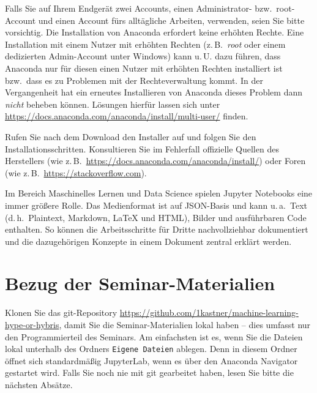 \documentclass{tufte-handout}
\begin{document}
Falls Sie auf Ihrem Endgerät zwei Accounts, einen Administrator- bzw.\ root-Account und einen Account fürs alltägliche Arbeiten, verwenden, seien Sie bitte vorsichtig.
Die Installation von Anaconda erfordert keine erhöhten Rechte.
Eine Installation mit einem Nutzer mit erhöhten Rechten (z.\,B.\ \emph{root} oder einem dedizierten Admin-Account unter Windows) kann u.\,U. dazu führen, dass Anaconda nur für diesen einen Nutzer mit erhöhten Rechten installiert ist bzw.\ dass es zu Problemen mit der Rechteverwaltung kommt.
In der Vergangenheit hat ein erneutes Installieren von Anaconda dieses Problem dann \emph{nicht} beheben können.
Lösungen hierfür lassen sich unter \url{https://docs.anaconda.com/anaconda/install/multi-user/} finden. 

Rufen Sie nach dem Download den Installer auf und folgen Sie den Installationsschritten.
Konsultieren Sie im Fehlerfall offizielle Quellen des Herstellers (wie z.\,B.\ \url{https://docs.anaconda.com/anaconda/install/})
oder Foren (wie z.\,B.\ \url{https://stackoverflow.com}).


Im Bereich Maschinelles Lernen und Data Science spielen Jupyter Notebooks eine immer größere Rolle.
Das Medienformat ist auf JSON-Basis und kann u.\,a.\
Text (d.\,h.\ Plaintext, Markdown, LaTeX und HTML),
Bilder und
ausführbaren Code enthalten.
So können die Arbeitsschritte für Dritte nachvollziehbar dokumentiert und die dazugehörigen Konzepte in einem Dokument zentral erklärt werden.


\section{Bezug der Seminar-Materialien}
\label{sec:git-clone}

Klonen Sie das git-Repository
\url{https://github.com/1kastner/machine-learning-hype-or-hybris},
damit Sie die Seminar-Materialien lokal haben -- dies umfasst nur den Programmierteil des Seminars.
Am einfachsten ist es, wenn Sie die Dateien lokal unterhalb des Ordners \texttt{Eigene Dateien} ablegen.
Denn in diesem Ordner öffnet sich standardmäßig JupyterLab, wenn es über den Anaconda Navigator gestartet wird.
Falls Sie noch nie mit git gearbeitet haben, lesen Sie bitte die nächsten Absätze.
\end{document}
